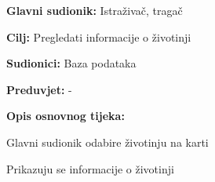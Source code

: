 					\noindent {}
					\begin{packed_item}
	
						\item \textbf{Glavni sudionik: } Istraživač, tragač
						\item  \textbf{Cilj:} Pregledati informacije o životinji
						\item  \textbf{Sudionici:} Baza podataka
						\item  \textbf{Preduvjet:} -
						\item  \textbf{Opis osnovnog tijeka:}
						
						\item[] \begin{packed_enum}
	
							\item Glavni sudionik odabire životinju na karti
							\item	Prikazuju se informacije o životinji
						
						\end{packed_enum}
					\end{packed_item}
				
